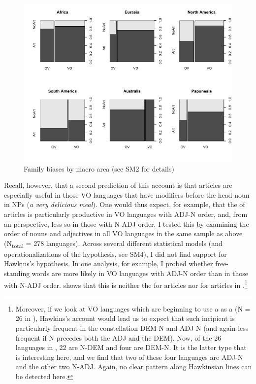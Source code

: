 \documentclass[output=paper]{langsci/langscibook}
\begin{document}
 
\begin{figure}
\includegraphics[width=\textwidth]{figures/ksb3.pdf}
\caption{Family biases by macro area (see SM2 for details)}
\label{fig:ksb:3}
\end{figure}
\newpage

Recall, however, that a second prediction of this account is that articles are especially useful in those VO languages that have modifiers before the head noun in NPs (\textit{a very delicious meal}). One would thus expect, for example, that the  of articles is particularly productive in VO languages with ADJ-N order, and, from an  perspective, less so in those with N-ADJ order. I tested this by examining the order of nouns and adjectives \citep{Dryer2013_Adj} in all VO languages in the same sample as above (N\textsubscript{total} = 278 languages). \newpage Across several different statistical models (and operationalizations of the hypothesis, see SM4), I did not find support for Hawkins’s  hypothesis. In one analysis, for example, I probed whether free-standing  words are more likely in VO languages with ADJ-N order than in those with N-ADJ order.  shows that this is neither the  for  articles nor for articles in .\footnote{Moreover, if we look at VO languages which are beginning to use a  as a   (N = 26 in \citealt{Dryer2013_Def}), Hawkins’s account would lead us to expect that such incipient  is particularly frequent in the constellation DEM-N and ADJ-N (and again less frequent if N precedes both the ADJ and the DEM). Now, of the 26 languages in , 22 are N-DEM and four are DEM-N. It is the latter type that is interesting here, and we find that two of these four languages are ADJ-N and the other two N-ADJ. Again, no clear pattern along Hawkinsian lines can be detected here.} 
\end{document}

